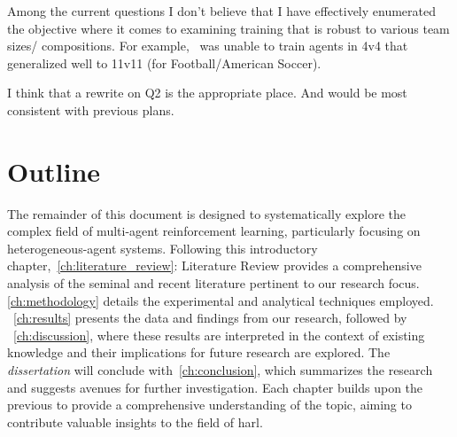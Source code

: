 \begin{comment}
    
\end{comment}

\begin{tcolorbox}[colback=blue!5,colframe=blue!50!black,title=Note to Editor]
    Among the current questions I don't believe that I have effectively enumerated the
    objective where it comes to examining training that is robust to various team sizes/
    compositions. For example,~\cite*{smit2023} was unable to train agents in 4v4 that generalized
    well to 11v11 (for Football/American Soccer).

    I think that a rewrite on Q2 is the appropriate place. 
    And would be most consistent with previous plans.
\end{tcolorbox}

\section{Outline}

The remainder of this document is designed to systematically explore the complex field of 
multi-agent reinforcement learning, particularly focusing on heterogeneous-agent systems.
Following this introductory chapter,~\ref*{ch:literature_review}: Literature Review provides a 
comprehensive analysis of the seminal and recent literature pertinent to our research focus.%
\ref*{ch:methodology} details the experimental and analytical techniques employed.
~\ref*{ch:results} presents the data and findings from our research, followed by 
~\ref*{ch:discussion}, where these results are interpreted in the context of existing 
knowledge and their implications for future research are explored.
The \emph{dissertation} will conclude with~\ref*{ch:conclusion}, 
which summarizes the research and suggests avenues for further investigation. 
Each chapter builds upon the previous to provide a comprehensive understanding of the topic, 
aiming to contribute valuable insights to the field of \gls*{harl}.

